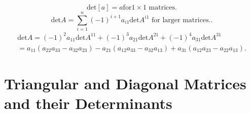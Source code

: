 \documentclass{report}
\begin{document}
              \[
              \text{det} \left[ a \right] = a   \text{for} 1\times 1 \text{ matrices}
              .\] 
              \[
              \text{det} A = \sum\limits_{i=1}^{n} \left( -1 \right) ^{i+1}a_{i 1} \text{det} A ^{i 1} \text{ for larger matrices.}
              .\] 
              \begin{align*}
                      \text{det} A = \left( -1 \right) ^2 a_{11} \text{det} A^{11}+ \left( -1 \right) ^3 a_{21} \text{det} A^{21} + \left( -1 \right) ^{4} a_{31} \text{det}  A ^{31}\\
                      = a_{11} \left( a_{22} a_{33} - a_{32} a_{23} \right) - a_{21} \left( a_{12} a_{33} -a_{32} a_{13} \right) +a_{31} \left( a_{12} a_{23} - a_{22} a_{13} \right) 
              .\end{align*}
\section{Triangular and Diagonal Matrices and their Determinants}
\end{document}
